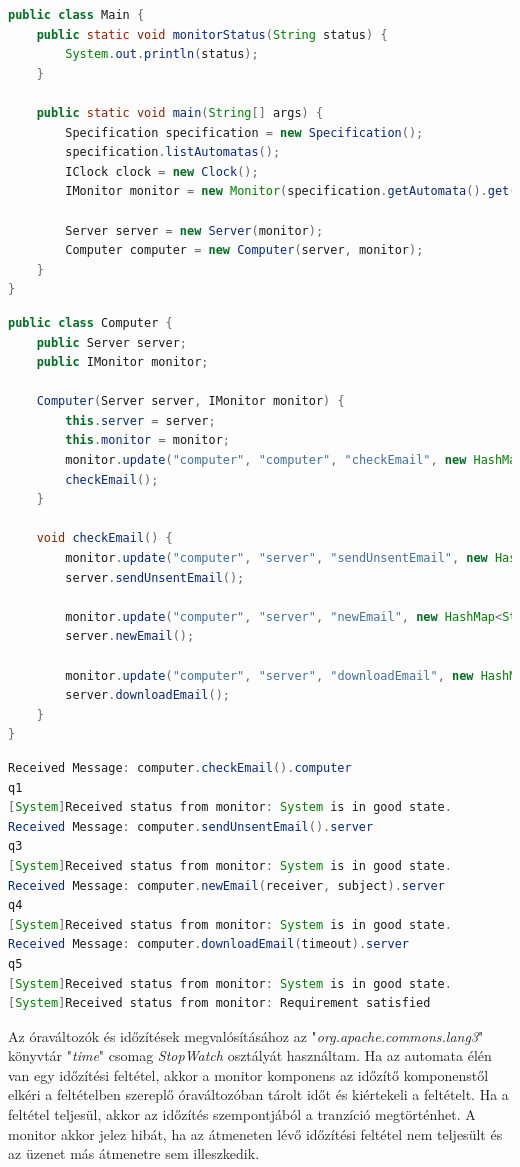 \begin{lstlisting}[language=java, frame=single, float=ht!, caption={Időzítéses példához tartozó Main osztály.},captionpos=b,label=computer_main]
public class Main {
	public static void monitorStatus(String status) {
		System.out.println(status);
	}

	public static void main(String[] args) {
		Specification specification = new Specification();
		specification.listAutomatas();
		IClock clock = new Clock();
		IMonitor monitor = new Monitor(specification.getAutomata().get(0), clock);

		Server server = new Server(monitor);
		Computer computer = new Computer(server, monitor);
	}
}
\end{lstlisting}

\begin{lstlisting}[language=java, frame=single, float=ht!, caption={A Computer java osztálya.},captionpos=b,label=computer_java]
public class Computer {
	public Server server;
	public IMonitor monitor;

	Computer(Server server, IMonitor monitor) {
		this.server = server;
		this.monitor = monitor;
		monitor.update("computer", "computer", "checkEmail", new HashMap<String, Object>());
		checkEmail();
	}

	void checkEmail() {
		monitor.update("computer", "server", "sendUnsentEmail", new HashMap<String, Object>());
		server.sendUnsentEmail();

		monitor.update("computer", "server", "newEmail", new HashMap<String, Object>());
		server.newEmail();

		monitor.update("computer", "server", "downloadEmail", new HashMap<String, Object>());
		server.downloadEmail();
	}
}
\end{lstlisting}

\begin{lstlisting}[language=java, frame=single, float=ht!, caption={Időzítéses példa monitor kimenete.},captionpos=b,label=computer_monitor]
Received Message: computer.checkEmail().computer
q1
[System]Received status from monitor: System is in good state.
Received Message: computer.sendUnsentEmail().server
q3
[System]Received status from monitor: System is in good state.
Received Message: computer.newEmail(receiver, subject).server
q4
[System]Received status from monitor: System is in good state.
Received Message: computer.downloadEmail(timeout).server
q5
[System]Received status from monitor: System is in good state.
[System]Received status from monitor: Requirement satisfied
\end{lstlisting}

Az óraváltozók és időzítések megvalósításához az "\textit{org.apache.commons.lang3}" könyvtár "\textit{time}" csomag \textit{StopWatch} osztályát használtam.
Ha az automata élén van egy időzítési feltétel, akkor a monitor komponens az időzítő komponenstől elkéri a feltételben szereplő óraváltozóban tárolt időt és kiértekeli a feltételt.
Ha a feltétel teljesül, akkor az időzítés szempontjából a tranzíció megtörténhet.
A monitor akkor jelez hibát, ha az átmeneten lévő időzítési feltétel nem teljesült és az üzenet más átmenetre sem illeszkedik.